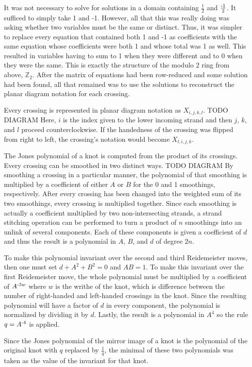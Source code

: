 \begin{paper}
It was not necessary to solve for solutions in a domain containing $\frac12$ and
$\frac{\text-1}2$.
It sufficed to simply take 1 and -1.
However, all that this was really doing was asking whether two variables must be
the same or distinct.
Thus, it was simpler to replace every equation that contained both 1 and -1 as
coefficients with the same equation whose coefficients were both 1 and whose
total was 1 as well.
This resulted in variables having to sum to 1 when they were different and to 0
when they were the same.
This is exactly the structure of the modulo 2 ring from above, $\mathbb{Z}_2$.
After the matrix of equations had been row-reduced and some solution had been
found, all that remained was to use the solutions to reconstruct the planar
diagram notation for each crossing.

Every crossing is represented in planar diagram notation as $X_{i,j,k,l}$. TODO
DIAGRAM
Here, $i$ is the index given to the lower incoming strand and then $j$, $k$, and
$l$ proceed counterclockwise.
If the handedness of the crossing was flipped from right to left, the crossing's
notation would become $X_{l,i,j,k}$.


The Jones polynomial of a knot is computed from the product of its crossings.
Every crossing can be smoothed in two distinct ways. TODO DIAGRAM
By smoothing a crossing in a particular manner, the polynomial of that smoothing
is multiplied by a coefficient of either $A$ or $B$ for the 0 and 1 smoothings,
respectively.
After every crossing has been changed into the weighted sum of its two
smoothings, every crossing is multiplied together.
Since each smoothing is actually a coefficient multiplied by two
non-intersecting strands, a strand stitching operation can be performed to turn
a product of $n$ smoothings into an unlink of several components.
Each of these components is given a coefficient of $d$ and thus the result is a
polynomial in $A$, $B$, and $d$ of degree $2n$.

To make this polynomial invariant over the second and third Reidemeister moves,
then one must set $d+A^2+B^2=0$ and $AB=1$.
To make this invariant over the first Reidemeister move, the whole polynomial
must be multiplied by a coefficient of $A^{\text-3w}$ where $w$ is the writhe of
the knot, which is difference between the number of right-handed and left-handed
crossings in the knot.
Since the resulting polynomial will have a factor of $d$ in every component, the
polynomial is normalized by dividing it by $d$.
Lastly, the result is a polynomial in $A^4$ so the rule $q=A^{\text-4}$ is
applied.

Since the Jones polynomial of the mirror image of a knot is the polynomial of
the original knot with $q$ replaced by $\frac1q$, the minimal of these two
polynomials was taken as the value of the invariant for that knot.
\end{paper}

